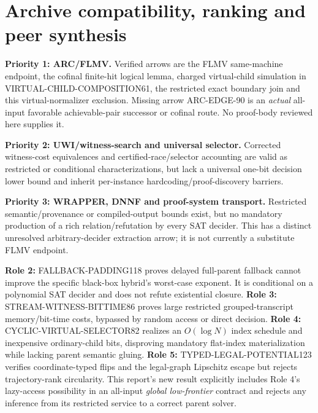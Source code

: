 \documentclass[11pt]{article}
\begin{document}
\section{Archive compatibility, ranking and peer synthesis}
\par\noindent\textbf{Priority 1: ARC/FLMV.} Verified arrows are the FLMV same-machine endpoint, the cofinal finite-hit logical lemma, charged virtual-child simulation in VIRTUAL-CHILD-COMPOSITION61, the restricted exact boundary join and this virtual-normalizer exclusion. Missing arrow ARC-EDGE-90 is an \emph{actual} all-input favorable achievable-pair successor or cofinal route. No proof-body reviewed here supplies it.
\par\noindent\textbf{Priority 2: UWI/witness-search and universal selector.} Corrected witness-cost equivalences and certified-race/selector accounting are valid as restricted or conditional characterizations, but lack a universal one-bit decision lower bound and inherit per-instance hardcoding/proof-discovery barriers.
\par\noindent\textbf{Priority 3: WRAPPER, DNNF and proof-system transport.} Restricted semantic/provenance or compiled-output bounds exist, but no mandatory production of a rich relation/refutation by every SAT decider. This has a distinct unresolved arbitrary-decider extraction arrow; it is not currently a substitute FLMV endpoint.

\par\noindent\textbf{Role 2:} FALLBACK-PADDING118 proves delayed full-parent fallback cannot improve the specific black-box hybrid's worst-case exponent. It is conditional on a polynomial SAT decider and does not refute existential closure. \textbf{Role 3:} STREAM-WITNESS-BITTIME86 proves large restricted grouped-transcript memory/bit-time costs, bypassed by random access or direct decision. \textbf{Role 4:} CYCLIC-VIRTUAL-SELECTOR82 realizes an $O(\log N)$ index schedule and inexpensive ordinary-child bits, disproving mandatory flat-index materialization while lacking parent semantic gluing. \textbf{Role 5:} TYPED-LEGAL-POTENTIAL123 verifies coordinate-typed flips and the legal-graph Lipschitz escape but rejects trajectory-rank circularity. This report's new result explicitly includes Role 4's lazy-access possibility in an all-input \emph{global low-frontier} contract and rejects any inference from its restricted service to a correct parent solver.
\end{document}
